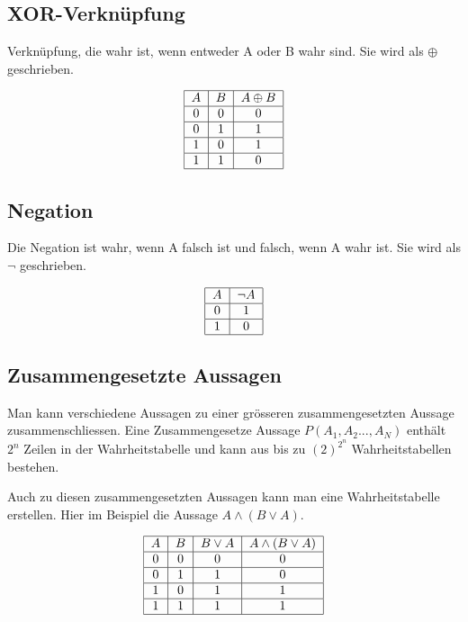 \documentclass[12pt, a4paper, oneside]{article}
\begin{document}
\subsection{XOR-Verknüpfung}
Verknüpfung, die wahr ist, wenn entweder A oder B wahr sind. Sie wird als $\oplus$ geschrieben.

\begin{equation*}
  \begin{tabular}{| c | c | c |}
    \hline
    $A$ & $B$ & $A \oplus B$ \\ \hline
    0 & 0 & 0 \\ \hline
    0 & 1 & 1 \\ \hline
    1 & 0 & 1 \\ \hline
    1 & 1 & 0 \\ \hline
  \end{tabular}
\end{equation*}


\subsection{Negation}
Die Negation ist wahr, wenn A falsch ist und falsch, wenn A wahr ist. Sie wird als $\lnot$ geschrieben.

\begin{equation*}
  \begin{tabular}{|c |c |}
    \hline
    $A$ & $\lnot A$ \\ \hline
    0 & 1 \\ \hline
    1 & 0 \\ \hline
  \end{tabular}
\end{equation*}


\subsection{Zusammengesetzte Aussagen}
Man kann verschiedene Aussagen zu einer  grösseren zusammengesetzten Aussage zusammenschliessen. Eine Zusammengesetze Aussage $P(A_{1}, A_{2}..., A_{N})$ enthält $2^{n}$ Zeilen in der Wahrheitstabelle und kann aus bis zu $(2)^{2^{n}}$ Wahrheitstabellen bestehen.

Auch zu diesen zusammengesetzten Aussagen kann man eine Wahrheitstabelle erstellen. Hier im Beispiel die Aussage $A \land (B \lor A)$.

\begin{equation*}
  \begin{tabular}{| c | c | c | c |}
    \hline
    $A$ & $B$ & $B \lor A$ & $A \land (B \lor A)$ \\ \hline
    0 & 0 & 0 & 0 \\ \hline
    0 & 1 & 1 & 0 \\ \hline
    1 & 0 & 1 & 1 \\ \hline
    1 & 1 & 1 & 1 \\ \hline
  \end{tabular}
\end{equation*}
\end{document}

